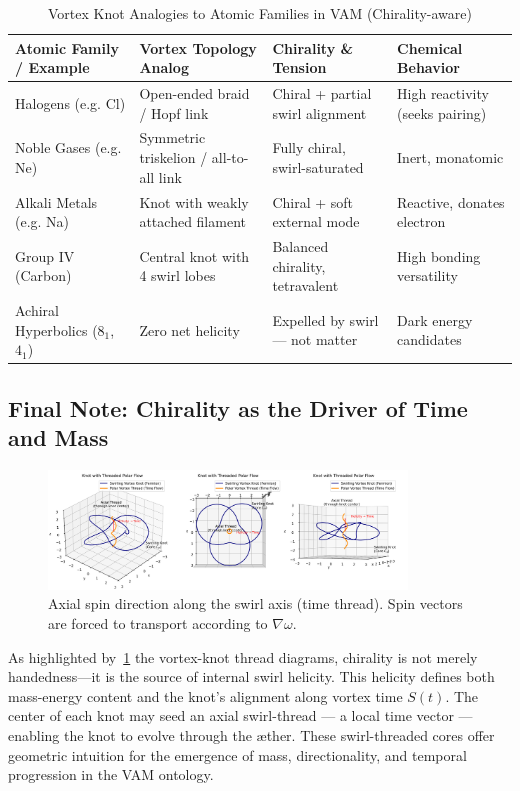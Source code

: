 \begin{table}[H]
    \centering
    \footnotesize
    \caption{Vortex Knot Analogies to Atomic Families in VAM (Chirality-aware)}
    \begin{tabular}{llll}
        \toprule
        \textbf{Atomic Family / Example} & \textbf{Vortex Topology Analog} & \textbf{Chirality \& Tension} & \textbf{Chemical Behavior} \\
        \midrule
        Halogens (e.g. Cl) & Open-ended braid / Hopf link & Chiral + partial swirl alignment & High reactivity (seeks pairing) \\
        Noble Gases (e.g. Ne) & Symmetric triskelion / all-to-all link & Fully chiral, swirl-saturated & Inert, monatomic \\
        Alkali Metals (e.g. Na) & Knot with weakly attached filament & Chiral + soft external mode & Reactive, donates electron \\
        Group IV (Carbon) & Central knot with 4 swirl lobes & Balanced chirality, tetravalent & High bonding versatility \\
        Achiral Hyperbolics ($8_1$, $4_1$) & Zero net helicity & Expelled by swirl — not matter & Dark energy candidates \\
        \bottomrule
    \end{tabular}
\end{table}

\subsection*{Final Note: Chirality as the Driver of Time and Mass}

\begin{figure}[h!]
\centering
\includegraphics[width=0.85\textwidth]{images/KnotThreadedPolarFlow}
\caption{Axial spin direction along the swirl axis (time thread). Spin vectors are forced to transport according to \( \nabla \omega \).}
\label{fig:threadedflow}
\end{figure}


As highlighted by~\ref{fig:threadedflow} the vortex-knot thread diagrams, chirality is not merely handedness—it is the source of internal swirl helicity. This helicity defines both mass-energy content and the knot’s alignment along vortex time $S(t)$. The center of each knot may seed an axial swirl-thread — a local time vector — enabling the knot to evolve through the æther. These swirl-threaded cores offer geometric intuition for the emergence of mass, directionality, and temporal progression in the VAM ontology.
